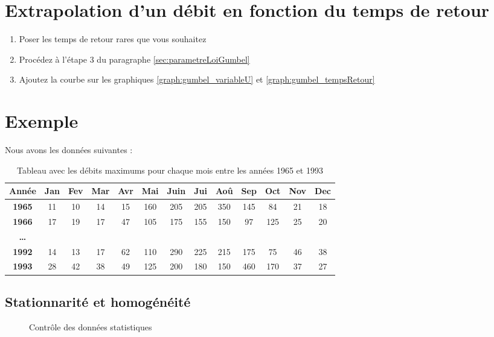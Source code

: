 \section{Extrapolation d'un débit en fonction du temps de retour}
\begin{enumerate}
    \item Poser les temps de retour rares que vous souhaitez
    \item Procédez à l'étape 3 du paragraphe \ref{sec:parametreLoiGumbel}
    \item Ajoutez la courbe sur les graphiques \ref{graph:gumbel_variableU} et \ref{graph:gumbel_tempsRetour}
\end{enumerate}

\section{Exemple}
Nous avons les données suivantes :
\begin{table}[H]
    \centering
    \begin{tabular}{|c||c|c|c|c|c|c|c|c|c|c|c|c|}
        \hline
        \textbf{Année} & \textbf{Jan} & \textbf{Fev} & \textbf{Mar} & \textbf{Avr} & \textbf{Mai} & \textbf{Juin} & \textbf{Jui} & \textbf{Aoû} & \textbf{Sep} & \textbf{Oct} & \textbf{Nov} & \textbf{Dec} \\
        \hline \hline
        \textbf{1965}  & 11 & \cellcolor{green}10 & 14 & 15 & 160 & 205 & 205 & \cellcolor{red}350 & 145 &  84 &  21 & 18 \\
        \hline
        \textbf{1966}  & \cellcolor{green}17 & 19 & 17 & 47 & 105 & \cellcolor{red}175 & 155 & 150 &  97 & 125 &  25 & 20 \\
        \hline
        \textbf{\dots} &    &    &    &    &     &     &     &     &       &     &     &      \\
        \hline
        \textbf{1992}  & 14 & \cellcolor{green}13 & 17 & 62 & 110 & \cellcolor{red}290 & 225 & 215 & 175 &  75 &  46 & 38 \\
        \hline
        \textbf{1993}  & 28 & 42 & 38 & 49 & 125 & 200 & 180 & 150 & \cellcolor{red}460 & 170 &  37 & \cellcolor{green}27 \\
        \hline
    \end{tabular}
    \caption{Tableau avec les débits maximums pour chaque mois entre les années 1965 et 1993}
    \label{tab:seriesAnnuellesMaximum}
\end{table}

\subsection{Stationnarité et homogénéité}
\begin{figure}[H]
    \centering
    \caption{Contrôle des données statistiques}
    \label{graph:controleData}
\end{figure}

